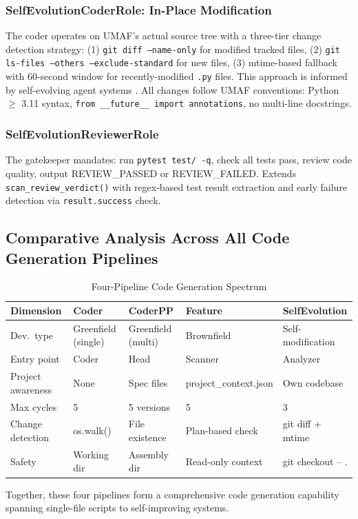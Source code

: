 \subsubsection{SelfEvolutionCoderRole: In-Place Modification}

The coder operates on UMAF's actual source tree with a three-tier change detection strategy: (1) \texttt{git diff --name-only} for modified tracked files, (2) \texttt{git ls-files --others --exclude-standard} for new files, (3) mtime-based fallback with 60-second window for recently-modified \texttt{.py} files. This approach is informed by self-evolving agent systems \cite{socraticswe,pace,sage}. All changes follow UMAF conventions: Python $\ge$ 3.11 syntax, \texttt{from \_\_future\_\_ import annotations}, no multi-line docstrings.

\subsubsection{SelfEvolutionReviewerRole}

The gatekeeper mandates: run \texttt{pytest test/ -q}, check all tests pass, review code quality, output REVIEW\_PASSED or REVIEW\_FAILED. Extends \texttt{scan\_review\_verdict()} with regex-based test result extraction and early failure detection via \texttt{result.success} check.

\subsection{Comparative Analysis Across All Code Generation Pipelines}

\begin{table}[H]
\centering
\small
\caption{Four-Pipeline Code Generation Spectrum}
\label{tab:codegen}
\begin{tabular}{@{}p{2.2cm}p{2.6cm}p{2.6cm}p{3.2cm}p{3.2cm}@{}}
\toprule
\textbf{Dimension} & \textbf{Coder} & \textbf{CoderPP} & \textbf{Feature} & \textbf{SelfEvolution} \\
\midrule
Dev.\ type & Greenfield (single) & Greenfield (multi) & Brownfield & Self-modification \\
Entry point & Coder & Head & Scanner & Analyzer \\
Project awareness & None & Spec files & project\_context.json & Own codebase \\
Max cycles & 5 & 5 versions & 5 & 3 \\
Change detection & os.walk() & File existence & Plan-based check & git diff + mtime \\
Safety & Working dir & Assembly dir & Read-only context & git checkout -- . \\
\bottomrule
\end{tabular}
\end{table}

Together, these four pipelines form a comprehensive code generation capability spanning single-file scripts to self-improving systems.

